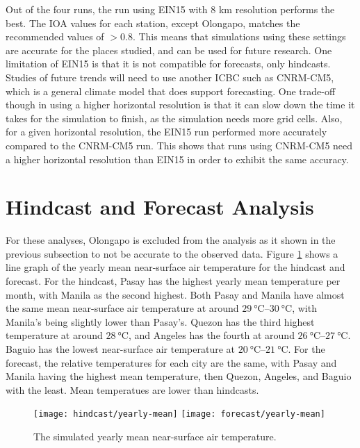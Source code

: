 	Out of the four runs, the run using EIN15 with 8 km resolution performs the best.
	The IOA values for each station, except Olongapo, matches the recommended values of $> 0.8$.
	This means that simulations using these settings are accurate for the places studied, and can be used for future research.
	One limitation of EIN15 is that it is not compatible for forecasts, only hindcasts. Studies of future trends will need to use another ICBC such as CNRM-CM5, which is  a general climate model that does support forecasting.
	One trade-off though in using a higher horizontal resolution is that it can slow down the time it takes for the simulation to finish, as the simulation needs more grid cells.
	Also, for a given horizontal resolution, the EIN15 run performed more accurately compared to the CNRM-CM5 run. 
	This shows that runs using CNRM-CM5 need a higher horizontal resolution than EIN15 in order to exhibit the same accuracy.

\section{Hindcast and Forecast Analysis}
	For these analyses, Olongapo is excluded from the analysis as it shown in the previous subsection to not be accurate to the observed data.
	Figure \ref{fig:hindcast-yearly-mean} shows a line graph  of the yearly mean near-surface air temperature for the hindcast and forecast.		
	For the hindcast,
	Pasay has the highest yearly mean temperature per month, with Manila as the second highest.
	Both Pasay and Manila have almost the same mean near-surface air temperature at around $\qtyrange{29}{30}{\degreeCelsius}$, with Manila's being slightly lower than Pasay's.
	Quezon has the third highest temperature at around $\qty{28}{\degreeCelsius}$, 
		and Angeles has the fourth at around $\qtyrange{26}{27}{\degreeCelsius}$.
	Baguio has the lowest near-surface air temperature at $\qtyrange{20}{21}{\degreeCelsius}$.
	For the forecast, the relative temperatures for each city are the same, with Pasay and Manila having the highest mean temperature, then Quezon, Angeles, and Baguio with the least.
	Mean temperatues are lower than hindcasts.
	
	\begin{figure}	
		\centering
		\texttt{[image: hindcast/yearly-mean]}
		\texttt{[image: forecast/yearly-mean]}
		\caption{
			The simulated yearly mean near-surface air temperature.
		}
		\label{fig:hindcast-yearly-mean}
	\end{figure}

